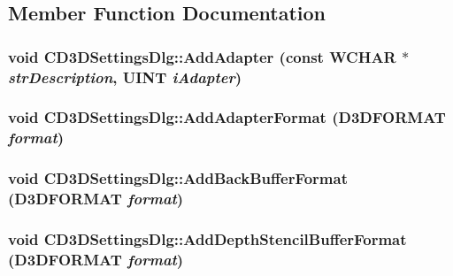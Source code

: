 \subsection{Member Function Documentation}
\hypertarget{class_c_d3_d_settings_dlg_af6f11fa22d6c9855beec1de19555df70}{
\subsubsection[{AddAdapter}]{\setlength{\rightskip}{0pt plus 5cm}void CD3DSettingsDlg::AddAdapter (const WCHAR $\ast$ {\em strDescription}, \/  UINT {\em iAdapter})}}
\label{class_c_d3_d_settings_dlg_af6f11fa22d6c9855beec1de19555df70}
\hypertarget{class_c_d3_d_settings_dlg_a980ec0d429e0c796284f9b1874510a14}{
\subsubsection[{AddAdapterFormat}]{\setlength{\rightskip}{0pt plus 5cm}void CD3DSettingsDlg::AddAdapterFormat (D3DFORMAT {\em format})}}
\label{class_c_d3_d_settings_dlg_a980ec0d429e0c796284f9b1874510a14}
\hypertarget{class_c_d3_d_settings_dlg_a8794267a14a02e711dca155c2cfc4290}{
\subsubsection[{AddBackBufferFormat}]{\setlength{\rightskip}{0pt plus 5cm}void CD3DSettingsDlg::AddBackBufferFormat (D3DFORMAT {\em format})}}
\label{class_c_d3_d_settings_dlg_a8794267a14a02e711dca155c2cfc4290}
\hypertarget{class_c_d3_d_settings_dlg_afd377864abb5683285ec335fe6011c7a}{
\subsubsection[{AddDepthStencilBufferFormat}]{\setlength{\rightskip}{0pt plus 5cm}void CD3DSettingsDlg::AddDepthStencilBufferFormat (D3DFORMAT {\em format})}}
